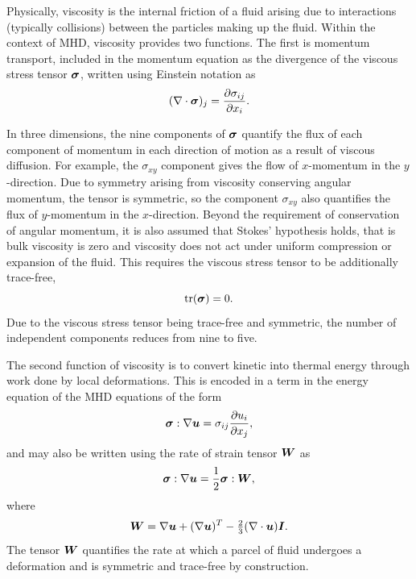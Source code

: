 Physically, viscosity is the internal friction of a fluid arising due to interactions (typically collisions) between the particles making up the fluid. Within the context of MHD, viscosity provides two functions. The first is momentum transport, included in the momentum equation as the divergence of the viscous stress tensor ${\bm \sigma}$, written using Einstein notation as
\begin{equation}
  \label{eq:viscous_momenum_transport}
  (\nabla \cdot {\bm \sigma})_j = \frac{\partial \sigma_{ij}}{\partial x_i}.
\end{equation}

In three dimensions, the nine components of ${\bm \sigma}$ quantify the flux of each component of momentum in each direction of motion as a result of viscous diffusion. For example, the $\sigma_{xy}$ component gives the flow of $x$-momentum in the $y$-direction. Due to symmetry arising from viscosity conserving angular momentum, the tensor is symmetric, so the component $\sigma_{xy}$ also quantifies the flux of $y$-momentum in the $x$-direction. Beyond the requirement of conservation of angular momentum, it is also assumed that Stokes' hypothesis holds, that is bulk viscosity is zero and viscosity does not act under uniform compression or expansion of the fluid. This requires the viscous stress tensor to be additionally trace-free,
\begin{equation}
  \label{eq:trace_free_tensor}
  \text{tr}({\bm \sigma}) = 0.
\end{equation}
Due to the viscous stress tensor being trace-free and symmetric, the number of independent components reduces from nine to five.

The second function of viscosity is to convert kinetic into thermal energy through work done by local deformations. This is encoded in a term in the energy equation of the MHD equations of the form
\begin{equation}
  \label{eq:viscous_heat_generation}
  {\bm \sigma} : \nabla {\bm u} = \sigma_{ij} \frac{\partial u_i}{\partial x_j},
\end{equation}
and may also be written using the rate of strain tensor ${\bm W}$ as
\begin{equation}
  \label{eq:viscous_heat_generation2}
  {\bm \sigma} : \nabla {\bm u} = \frac{1}{2} {\bm \sigma} : {\bm W},
\end{equation}
where
\begin{equation}
  \label{eq:rate_of_strain}
  {\bm W} = \nabla{\bm u} + (\nabla{\bm u})^T - \tfrac{2}{3}(\nabla \cdot {\bm u}){\bm I}.
\end{equation}
The tensor ${\bm W}$ quantifies the rate at which a parcel of fluid undergoes a deformation and is symmetric and trace-free by construction.

